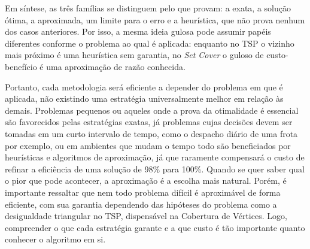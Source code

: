 Em síntese, as três famílias se distinguem pelo que provam: a exata, a solução ótima, a aproximada, um limite para o erro e a heurística, que não prova nenhum dos casos anteriores. Por isso, a mesma ideia gulosa pode assumir papéis diferentes conforme o problema ao qual é aplicada: enquanto no TSP o vizinho mais próximo é uma heurística sem garantia, no \textit{Set Cover} o guloso de custo-benefício é uma aproximação de razão conhecida.

Portanto, cada metodologia será eficiente a depender do problema em que é aplicada, não existindo uma estratégia universalmente melhor em relação às demais. Problemas pequenos ou aqueles onde a prova da otimalidade é essencial são favorecidos pelas estratégias exatas, já problemas cujas decisões devem ser tomadas em um curto intervalo de tempo, como o despacho diário de uma frota por exemplo, ou em ambientes que mudam o tempo todo são beneficiados por heurísticas e algoritmos de aproximação, já que raramente compensará o custo de refinar a eficiência de uma solução de 98\% para 100\%. Quando se quer saber qual o pior que pode acontecer, a aproximação é a escolha mais natural. Porém, é importante ressaltar que nem todo problema difícil é aproximável de forma eficiente, com sua garantia dependendo das hipóteses do problema como a desigualdade triangular no TSP, dispensável na Cobertura de Vértices. Logo, compreender o que cada estratégia garante e a que custo é tão importante quanto conhecer o algoritmo em si.
